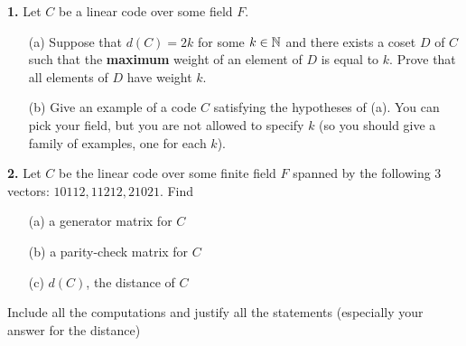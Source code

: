 \documentclass[12pt]{amsart}
\begin{document}
\skv
{\bf 1. }\rm Let $C$ be a linear code over some field $F$. 
\begin{itemize}
\item[(a)] Suppose that $d(C)=2k$ for some $k\in{\mathbb N}$ and there exists a coset $D$ of $C$ such that the {\bf maximum} weight of an element of $D$ is equal to $k$. Prove that all elements of $D$ have weight $k$.
\item[(b)] Give an example of a code $C$ satisfying the hypotheses of (a). You can pick your field, but you are not
allowed to specify $k$ (so you should give a family of examples, one for each $k$).
\end{itemize}
\skv
{\bf 2. }\rm  Let $C$ be the linear code over some finite field $F$ spanned by the following 3 vectors: $10112, 11212, 21021$. Find
\begin{itemize}
\item[(a)] a generator matrix for $C$
\item[(b)] a parity-check matrix for $C$
\item[(c)] $d(C)$, the distance of $C$
\end{itemize}
Include all the computations and justify all the statements (especially your answer for the distance)
\end{document}
